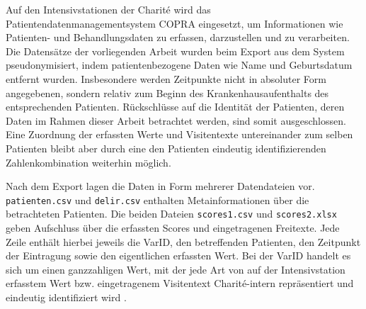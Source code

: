 Auf den Intensivstationen der Charité wird das Patientendatenmanagementsystem COPRA eingesetzt, um Informationen wie Patienten- und Behandlungsdaten zu erfassen, darzustellen und zu verarbeiten. Die Datensätze der vorliegenden Arbeit wurden beim Export aus dem System pseudonymisiert, indem patientenbezogene Daten wie Name und Geburtsdatum entfernt wurden. Insbesondere werden Zeitpunkte nicht in absoluter Form angegebenen, sondern relativ zum Beginn des Krankenhausaufenthalts des entsprechenden Patienten. Rückschlüsse auf die Identität der Patienten, deren Daten im Rahmen dieser Arbeit betrachtet werden, sind somit ausgeschlossen. Eine Zuordnung der erfassten Werte und Visitentexte untereinander zum selben Patienten bleibt aber durch eine den Patienten eindeutig identifizierenden Zahlenkombination weiterhin möglich.

Nach dem Export lagen die Daten in Form mehrerer Datendateien vor. \texttt{patienten.csv} und \texttt{delir.csv} enthalten Metainformationen über die betrachteten Patienten. Die beiden Dateien \texttt{scores1.csv} und \texttt{scores2.xlsx} geben Aufschluss über die erfassten Scores und eingetragenen Freitexte. Jede Zeile enthält hierbei jeweils die VarID, den betreffenden Patienten, den Zeitpunkt der Eintragung sowie den eigentlichen erfassten Wert. Bei der VarID handelt es sich um einen ganzzahligen Wert, mit der jede Art von auf der Intensivstation erfasstem Wert bzw. eingetragenem Visitentext Charité-intern repräsentiert und eindeutig identifiziert wird .

